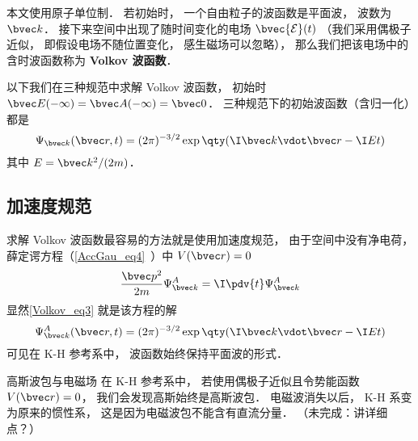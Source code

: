 
\begin{issues}
\issueTODO
\end{issues}


本文使用原子单位制． 若初始时， 一个自由粒子的波函数是平面波， 波数为 $\bvec k$． 接下来空间中出现了随时间变化的电场 $\bvec {\mathcal E}(t)$ （我们采用偶极子近似， 即假设电场不随位置变化， 感生磁场可以忽略）， 那么我们把该电场中的含时波函数称为 \textbf{Volkov 波函数}．

以下我们在三种规范中求解 Volkov 波函数， 初始时 $\bvec E(-\infty) = \bvec A(-\infty) = \bvec 0$． 三种规范下的初始波函数（含归一化）都是
\begin{equation}\label{Volkov_eq3}
\Psi_{\bvec k}(\bvec r, t) = (2\pi)^{-3/2} \exp\qty(\I\bvec k \vdot \bvec r - \I Et)
\end{equation}
其中 $E = \bvec k^2/(2m)$．

\subsection{加速度规范}
求解 Volkov 波函数最容易的方法就是使用加速度规范， 由于空间中没有净电荷， 薛定谔方程（\autoref{AccGau_eq4}~）中 $V(\bvec r) = 0$
\begin{equation}
\frac{\bvec p^2}{2m}\Psi_{\bvec k}^A = \I \pdv{t} \Psi_{\bvec k}^A
\end{equation}
显然\autoref{Volkov_eq3} 就是该方程的解
\begin{equation}\label{Volkov_eq2}
\Psi_{\bvec k}^A(\bvec r, t) = (2\pi)^{-3/2} \exp\qty(\I\bvec k \vdot \bvec r - \I Et)
\end{equation}
可见在 K-H 参考系中， 波函数始终保持平面波的形式．

\begin{example}{高斯波包与电磁场}
在 K-H 参考系中， 若使用偶极子近似且令势能函数 $V(\bvec r) = 0$， 我们会发现高斯始终是高斯波包． 电磁波消失以后， K-H 系变为原来的惯性系， 这是因为电磁波包不能含有直流分量． （未完成：讲详细点？）
\end{example}

